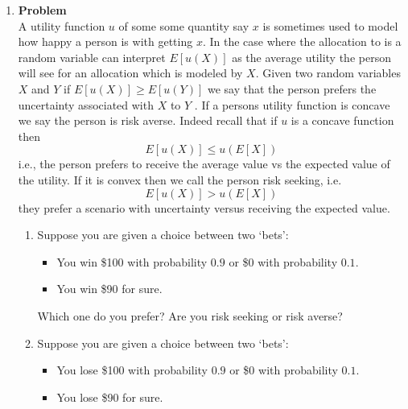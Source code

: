 \documentclass[12pt]{article}
\newenvironment{Ex}{\textbf{Problem}\vspace{.75em}\\}{}
\begin{document}
\begin{enumerate}
\begin{Ex}
      \begin{solution} \hfill \\
        {\huge TODO}
      \end{solution}
    \end{Ex}
  \item
    \begin{Ex}
      A utility function $u$ of some some quantity say $x$ is sometimes
      used to model how happy a person is with getting $x$. In the case
      where the allocation to is a random variable can interpret
      $E[u(X)]$ as the average utility the person will see for an
      allocation which is modeled by $X$. Given two random variables $X$
      and $Y$ if $E [u(X)] \ge E [u(Y)]$ we say that the person prefers
      the uncertainty associated with $X$ to $Y$ . If a persons utility
      function is concave we say the person is risk averse. Indeed
      recall that if $u$ is a concave function then
      $$ E[u(X)] \le u(E[X]) $$
      i.e., the person prefers to receive the average value vs the
      expected value of the utility. If it is convex then we call the
      person risk seeking, i.e.
      $$ E[u(X)] \gt u(E[X]) $$
      they prefer a scenario with uncertainty versus receiving the expected value.
      \begin{enumerate}
      \item Suppose you are given a choice between two `bets':
        \begin{itemize}
        \item You win \$100 with probability $0.9$ or \$0 with
          probability $0.1$.
        \item You win \$90 for sure.
        \end{itemize}
        Which one do you prefer? Are you risk
        seeking or risk averse?
      \item Suppose you are given a choice
        between two `bets':
        \begin{itemize}
        \item You lose \$100 with probability $0.9$ or \$0 with
          probability $0.1$.
        \item You lose \$90 for sure.

\end{itemize}
\end{enumerate}
\end{Ex}
\end{enumerate}
\end{document}
